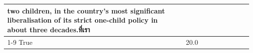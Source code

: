 \begin{table}[H]
\begin{tabular}{lllrlllll}
two children, in the country's most significant liberalisation of its strict one-child policy in about three decades.ที่เรา \\
\cline{1-9}
True & 20.0%
\end{tabular}
\end{table}
